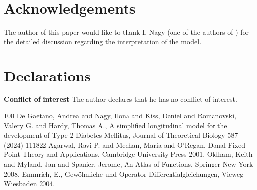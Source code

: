 \documentclass[pdflatex,sn-mathphys-num]{sn-jnl}
\theoremstyle{thmstyleone}
\theoremstyle{thmstyletwo}
\theoremstyle{thmstylethree}
\begin{document}
\section*{Acknowledgements}

The author of this paper would like to thank I. Nagy (one of the authors of \cite{degaetano2024}) 
for the detailed discussion regarding the interpretation of the model.

\section*{Declarations}

\textbf{Conflict of interest}  The author declares that he has no conflict of interest.
%
\begin{thebibliography}{100}
 De Gaetano, Andrea and Nagy, Ilona and Kiss, Daniel and Romanovski, Valery G. 
and Hardy, Thomas A., 
A simplified longitudinal model for the development of Type 2 Diabetes Mellitus,
Journal of Theoretical Biology 587 (2024) 111822
 Agarwal, Ravi P. and Meehan, Maria and O'Regan, Donal 
Fixed Point Theory and Applications, 
Cambridge University Press 2001.
 Oldham, Keith and Myland, Jan and Spanier, Jerome,
An Atlas of Functions, 
Springer New York 2008.
 Emmrich, E., Gew\"ohnliche und Operator-Differentialgleichungen, 
Vieweg Wiesbaden 2004.
\end{thebibliography}
\end{document}
